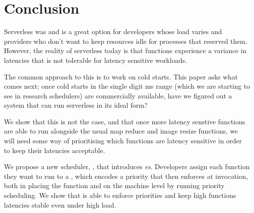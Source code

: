 \section{Conclusion}


Serverless was and is a great option for developers whose load varies and
providers who don't want to keep resources idle for processes that reserved
them. However, the reality of serverless today is that functions experience a
variance in latencies that is not tolerable for latency sensitive workloads. 

The common approach to this is to work on cold starts. This paper asks what
comes next; once cold starts in the single digit ms range (which we are starting
to see in research schedulers) are commercially available, have we figured out a
system that can run serverless in its ideal form?

We show that this is not the case, and that once more latency senstive functions
are able to run alongside the usual map reduce and image resize functions, we
will need some way of prioritising which functions are latency sensitive in
order to keep their latencies acceptable.

We propose a new scheduler, \sys{}, that introduces \emph{\priceclass{}es}.
Developers assign each function they want to run to a \priceclass{}, which
encodes a priority that \sys{} then enforces at invocation, both in placing the
function and on the machine level by running priority scheduling. We show that
\sys{} is able to enforce priorities and keep high \class{} functions latencies
stable even under high load.